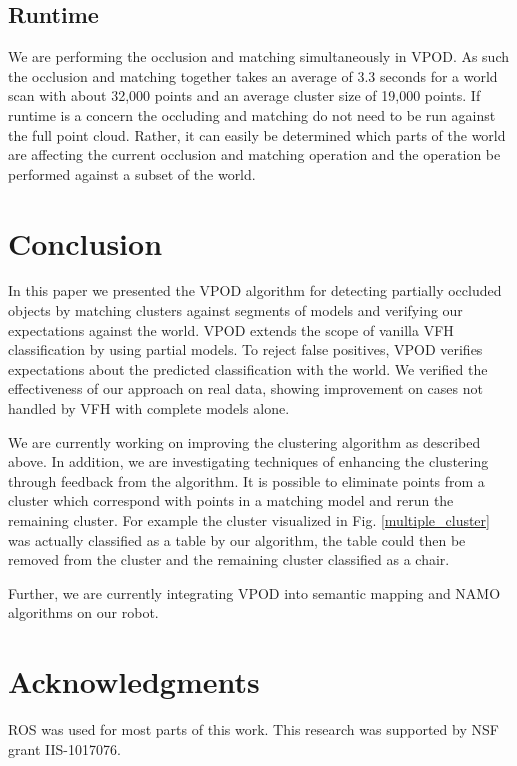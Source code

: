 \documentclass[letterpaper, 10pt, conference]{ieeeconf}
\begin{document}
\vspace{-5pt}
\subsection{Runtime}
We are performing the occlusion and matching simultaneously in VPOD. 
As such the occlusion and matching together takes an average of 3.3 seconds for a world scan with about 
32,000 points and an average cluster size of 19,000 points. If runtime is a concern the 
occluding and matching do not need to be run against the full point cloud. Rather, 
it can easily be determined which parts of the world are affecting the current occlusion 
and matching operation and the operation be performed against a subset of the world. 



\section{Conclusion}
\label{conclusion}

In this paper we presented the VPOD algorithm for detecting partially occluded objects by 
matching clusters against segments of models and verifying our expectations against the world. 
VPOD extends the scope of vanilla VFH classification by using
partial models. To reject false positives, VPOD verifies expectations about the predicted classification 
with the world. We verified the effectiveness of our approach on real data, showing 
improvement on cases not handled by VFH with complete models alone.

We are currently working on improving the clustering algorithm as described above. In addition, we are investigating techniques of enhancing the clustering through feedback from the algorithm. It is possible to eliminate points from a cluster which correspond with points in a matching model and rerun the remaining cluster. For example the cluster visualized in Fig. \ref{multiple_cluster} was actually classified as a table by our algorithm, the table could then be removed from the cluster and the remaining cluster classified as a chair.

Further, we are currently integrating VPOD into semantic mapping and NAMO
algorithms on our robot.

\section*{Acknowledgments}
ROS was used for most parts of this work. This research was supported by NSF
grant IIS-1017076.




\end{document}
